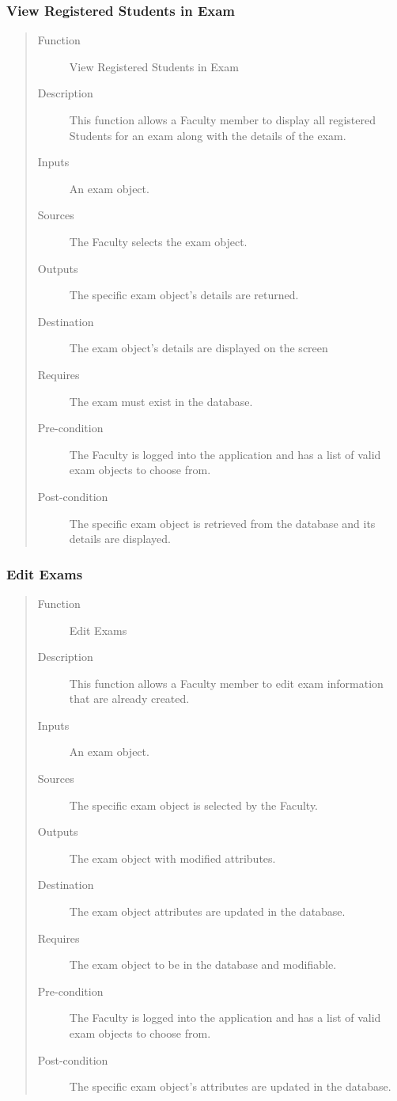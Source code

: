 \subsubsection{View Registered Students in Exam} 
\begin{quote} %
\begin{description}
\item[Function]
   View Registered Students in Exam
\item[Description]
   This function allows a Faculty member to display all registered Students for
   an exam along with the details of the exam.
\item[Inputs]
   An exam object.
\item[Sources]
   The Faculty selects the exam object.
\item[Outputs]
   The specific exam object's details are returned.
\item[Destination]
   The exam object's details are displayed on the screen
\item[Requires]
   The exam must exist in the database.
\item[Pre-condition]
   The Faculty is logged into the application and has a list of valid exam objects
   to choose from.
\item[Post-condition]
   The specific exam object is retrieved from the database and its details are
   displayed.
\end{description}
\end{quote} %

\subsubsection{Edit Exams} 
\begin{quote} %
\begin{description}
\item[Function]
   Edit Exams
\item[Description]
   This function allows a Faculty member to edit exam information that are
   already created.
\item[Inputs]
   An exam object.
\item[Sources]
   The specific exam object is selected by the Faculty.
\item[Outputs]
   The exam object with modified attributes.
\item[Destination]
   The exam object attributes are updated in the database.
\item[Requires]
   The exam object to be in the database and modifiable.
\item[Pre-condition]
   The Faculty is logged into the application and has a list of valid exam objects
   to choose from.
\item[Post-condition]
   The specific exam object's attributes are updated in the database.
\end{description}
\end{quote} %

